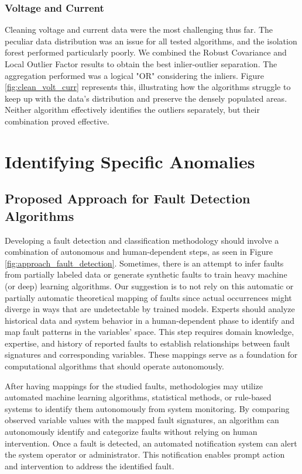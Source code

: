 \subsubsection{Voltage and Current}

Cleaning voltage and current data were the most challenging thus far. The peculiar data distribution was an issue for all tested algorithms, and the isolation forest performed particularly poorly. We combined the Robust Covariance and Local Outlier Factor results to obtain the best inlier-outlier separation. The aggregation performed was a logical "OR" considering the inliers. Figure \ref{fig:clean_volt_curr} represents this, illustrating how the algorithms struggle to keep up with the data's distribution and preserve the densely populated areas. Neither algorithm effectively identifies the outliers separately, but their combination proved effective.

\section{Identifying Specific Anomalies} \label{sec:pvplugin}

\subsection{Proposed Approach for Fault Detection Algorithms}

Developing a fault detection and classification methodology should involve a combination of autonomous and human-dependent steps, as seen in Figure \ref{fig:approach_fault_detection}. Sometimes, there is an attempt to infer faults from partially labeled data or generate synthetic faults to train heavy machine (or deep) learning algorithms. Our suggestion is to not rely on this automatic or partially automatic theoretical mapping of faults since actual occurrences might diverge in ways that are undetectable by trained models.
Experts should analyze historical data and system behavior in a human-dependent phase to identify and map fault patterns in the variables' space. This step requires domain knowledge, expertise, and history of reported faults to establish relationships between fault signatures and corresponding variables. These mappings serve as a foundation for computational algorithms that should operate autonomously.

After having mappings for the studied faults, methodologies may utilize automated machine learning algorithms, statistical methods, or rule-based systems to identify them autonomously from system monitoring. By comparing observed variable values with the mapped fault signatures, an algorithm can autonomously identify and categorize faults without relying on human intervention.
Once a fault is detected, an automated notification system can alert the system operator or administrator. This notification enables prompt action and intervention to address the identified fault.

